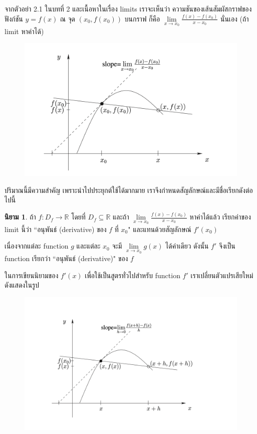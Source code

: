 \documentclass[
]{book}
\theoremstyle{definition}
\newtheorem{definition}{นิยาม}[chapter]
\theoremstyle{definition}
\theoremstyle{definition}
\theoremstyle{definition}
\theoremstyle{remark}
\begin{document}
จากตัวอย่า 2.1 ในบทที่ 2 และเนื้อหาในเรื่อง limits เราจะเห็นว่า
ความชันของเส้นสัมผัสกราฟของฟังก์ชัน \(y=f\left( x\right)\) ณ จุด
\(\left( x_{0},f\left( x_{0}\right) \right)\) บนกราฟ ก็คือ
\(\underset{x\rightarrow x_{0}}{\lim}\frac{f\left( x\right) -f\left( x_{0}\right) }{x-x_{0}}\)
นั่นเอง (ถ้า limit หาค่าได้)

\begin{figure}

{\centering \includegraphics[width=0.5\linewidth]{images/fig-derivative-1} 

}

\end{figure}

ปริมาณนี้มีความสำคัญ เพราะนำไปประยุกต์ใช้ได้มากมาย
เราจึงกำหนดสัญลักษณ์และมีชื่อเรียกดังต่อไปนี้

\begin{definition}
ถ้า \(f : D_f \rightarrow \mathbb{R}\) โดยที่ \(D_f \subseteq \mathbb{R}\)
และถ้า \(\underset{x \rightarrow x_0}{\lim} \frac{f(x)-f(x_0)}{x- x_0}\)
หาค่าได้แล้ว เรียกค่าของ limit นี้ว่า ``อนุพันธ์ (derivative) ของ \(f\) ที่ \(x_0\)"
และแทนด้วยสัญลักษณ์ \(f'(x_0)\)
\end{definition}

เนื่องจากแต่ละ function \(g\) และแต่ละ \(x_0\) จะมี
\(\underset{x \rightarrow x_0}{\lim}g(x)\) ได้ค่าเดียว ดังนั้น \(f'\) จึงเป็น
function เรียกว่า ``อนุพันธ์ (derivative)" ของ \(f\)

ในการเขียนนิยามของ \(f'(x)\) เพื่อใช้เป็นสูตรทั่วไปสำหรับ function \(f'\)
เราเปลี่ยนตัวแปรเสียใหม่ ดังแสดงในรูป

\begin{figure}

{\centering \includegraphics[width=0.5\linewidth]{images/fig-derivative-2} 

}

\end{figure}
\end{document}
